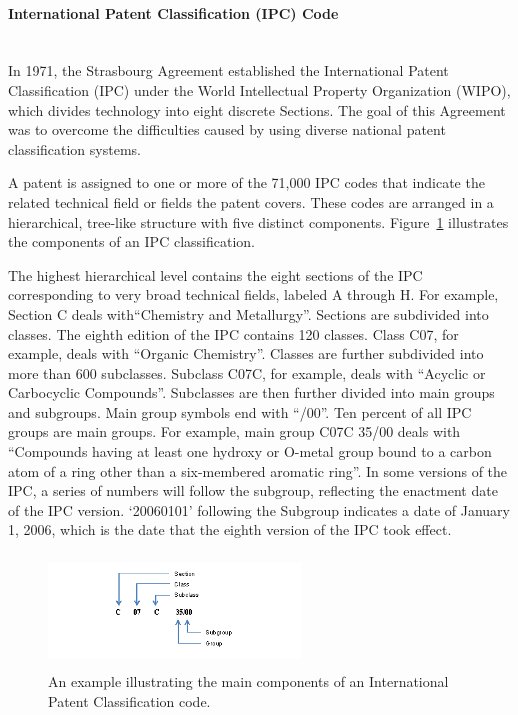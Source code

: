\paragraph{International Patent Classification (IPC) Code}
\ \\ 
In 1971, the Strasbourg Agreement established the International Patent Classification (IPC) under the World Intellectual Property Organization (WIPO), which divides technology into eight discrete Sections. The goal of this
Agreement was to overcome the difficulties caused by using diverse national patent classification systems.~\citep{harris2010comparison}

A patent is assigned to one or more of the 71,000 IPC codes that 
indicate the related technical field or fields the patent covers. 
These codes are arranged in a hierarchical, tree-like structure with 
five distinct components. Figure~\ref{fig:ipcexample} illustrates the components of an IPC classification.

The highest hierarchical level contains the eight sections of the IPC corresponding
to very broad technical fields, labeled A through H. For example, Section C deals
with``Chemistry and Metallurgy''. Sections are subdivided into classes. The eighth edition of the IPC contains 120
classes. Class C07, for example, deals with ``Organic Chemistry''. Classes are further subdivided into more than 600 subclasses. Subclass C07C, for example, deals with ``Acyclic or Carbocyclic Compounds''. Subclasses are then further divided into main groups and subgroups. Main group symbols end with ``/00''. Ten percent of all IPC groups are main
groups. For example, main group C07C 35/00 deals with ``Compounds having at
least one hydroxy or O-metal group bound to a carbon atom of a ring other than
a six-membered aromatic ring''. In some versions of the IPC, a series of numbers will follow the subgroup, reflecting
the enactment date of the IPC version. `20060101' following the Subgroup
indicates a date of January 1, 2006, which is the date that the eighth version of
the IPC took effect. 
\begin{figure}[t!]
   \centering
   \includegraphics[width=0.60\textwidth,height=30mm]{figs/IPCexample.jpg}
   \caption{An example illustrating the main components of an International Patent Classification code.}   
   \label{fig:ipcexample} 
\end{figure}

